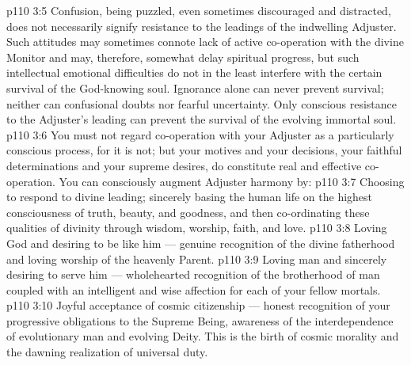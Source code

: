 \vs p110 3:5 \pc Confusion, being puzzled, even sometimes discouraged and distracted, does not necessarily signify resistance to the leadings of the indwelling Adjuster. Such attitudes may sometimes connote lack of active co\hyp{}operation with the divine Monitor and may, therefore, somewhat delay spiritual progress, but such intellectual emotional difficulties do not in the least interfere with the certain survival of the God\hyp{}knowing soul. Ignorance alone can never prevent survival; neither can confusional doubts nor fearful uncertainty. Only conscious resistance to the Adjuster’s leading can prevent the survival of the evolving immortal soul.
\vs p110 3:6 You must not regard co\hyp{}operation with your Adjuster as a particularly conscious process, for it is not; but your motives and your decisions, your faithful determinations and your supreme desires, do constitute real and effective co\hyp{}operation. You can consciously augment Adjuster harmony by:
\vs p110 3:7 \bibnobreakspace Choosing to respond to divine leading; sincerely basing the human life on the highest consciousness of truth, beauty, and goodness, and then co\hyp{}ordinating these qualities of divinity through wisdom, worship, faith, and love.
\vs p110 3:8 \bibnobreakspace Loving God and desiring to be like him --- genuine recognition of the divine fatherhood and loving worship of the heavenly Parent.
\vs p110 3:9 \bibnobreakspace Loving man and sincerely desiring to serve him --- wholehearted recognition of the brotherhood of man coupled with an intelligent and wise affection for each of your fellow mortals.
\vs p110 3:10 \bibnobreakspace Joyful acceptance of cosmic citizenship --- honest recognition of your progressive obligations to the Supreme Being, awareness of the interdependence of evolutionary man and evolving Deity. This is the birth of cosmic morality and the dawning realization of universal duty.
